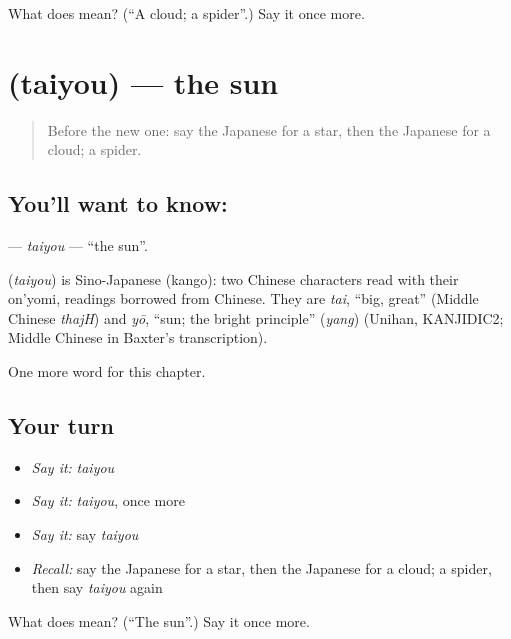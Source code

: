 \begin{tcolorbox}[breakable,colback=teal!4,colframe=teal!35!black,title={Before you move on}]
What does  mean? (\textquotedblleft{}A cloud; a spider\textquotedblright{}.) Say it once more.
\end{tcolorbox}
\section[\texorpdfstring{\ja{たいよう} (taiyou)}{たいよう (taiyou)}]{ (taiyou) — the sun}

\label{lesson:JA-C43-taiyou}



\begin{quote}
Before the new one: say the Japanese for a star, then the Japanese for a cloud; a spider.
\end{quote}

\subsection*{You'll want to know: }
\textbf{} — \emph{taiyou} — \textquotedblleft{}the sun\textquotedblright{}.

\begin{cousinweb}
\textbf{} (\emph{taiyou}) is Sino-Japanese (kango): two Chinese characters read with their on'yomi, readings borrowed from Chinese. They are \emph{tai}, \textquotedblleft{}big, great\textquotedblright{} (Middle Chinese \emph{thajH}) and \emph{yō}, \textquotedblleft{}sun; the bright principle\textquotedblright{} (\emph{yang}) (Unihan, KANJIDIC2; Middle Chinese in Baxter's transcription).
\end{cousinweb}

\begin{grammarlens}[title={What you've built}]
One more word for this chapter.
\end{grammarlens}

\subsection*{Your turn}
\begin{itemize}
\raggedright
  \item \emph{Say it:} \emph{taiyou}
  \item \emph{Say it:} \emph{taiyou}, once more
  \item \emph{Say it:} say \emph{taiyou}
  \item \emph{Recall:} say the Japanese for a star, then the Japanese for a cloud; a spider, then say \emph{taiyou} again
\end{itemize}

\begin{tcolorbox}[breakable,colback=teal!4,colframe=teal!35!black,title={Before you move on}]
What does  mean? (\textquotedblleft{}The sun\textquotedblright{}.) Say it once more.
\end{tcolorbox}
